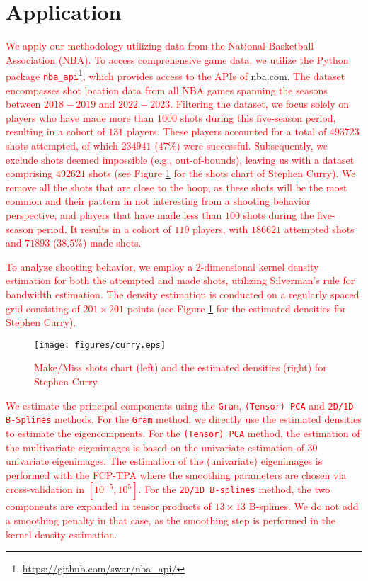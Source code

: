 \section{Application} %
\label{sec:application}

\textcolor{red}{We apply our methodology utilizing data from the National Basketball Association (NBA). To access comprehensive game data, we utilize the Python package \texttt{nba\_api}\footnote{\url{https://github.com/swar/nba_api/}}, which provides access to the APIs of \url{nba.com}. The dataset encompasses shot location data from all NBA games spanning the seasons between $2018-2019$ and $2022-2023$. Filtering the dataset, we focus solely on players who have made more than $1000$ shots during this five-season period, resulting in a cohort of $131$ players. These players accounted for a total of $493723$ shots attempted, of which $234941$ ($47\%$) were successful. Subsequently, we exclude shots deemed impossible (e.g., out-of-bounds), leaving us with a dataset comprising $492621$ shots (see Figure \ref{fig:shoots_make_miss} for the shots chart of Stephen Curry). We remove all the shots that are close to the hoop, as these shots will be the most common and their pattern in not interesting from a shooting behavior perspective, and players that have made less than $100$ shots during the five-season period. It results in a cohort of $119$ players, with $186621$ attempted shots and $71893$ ($38.5\%$) made shots.}

\textcolor{red}{To analyze shooting behavior, we employ a 2-dimensional kernel density estimation for both the attempted and made shots, utilizing Silverman's rule \citep{silvermanDensityEstimationStatistics1986} for bandwidth estimation. The density estimation is conducted on a regularly spaced grid consisting of $201 \times 201$ points (see Figure \ref{fig:shoots_make_miss} for the estimated densities for Stephen Curry).}
\begin{figure}
    \centering
    \texttt{[image: figures/curry.eps]}
    \caption{\textcolor{red}{Make/Miss shots chart (left) and the estimated densities (right) for Stephen Curry.}}
    \label{fig:shoots_make_miss}
\end{figure}


\textcolor{red}{We estimate the principal components using the \texttt{Gram}, \texttt{(Tensor) PCA} and \texttt{2D/1D B-Splines} methods. For the \texttt{Gram} method, we directly use the estimated densities to estimate the eigencompnents. For the \texttt{(Tensor) PCA} method, the estimation of the multivariate eigenimages is based on the univariate estimation of $30$ univariate eigenimages. The estimation of the (univariate) eigenimages is performed with the FCP-TPA where the smoothing parameters are chosen via cross-validation in $[10^{-5}, 10^5]$. For the \texttt{2D/1D B-splines} method, the two components are expanded in tensor products of $13 \times 13$ B-splines. We do not add a smoothing penalty in that case, as the smoothing step is performed in the kernel density estimation.}

